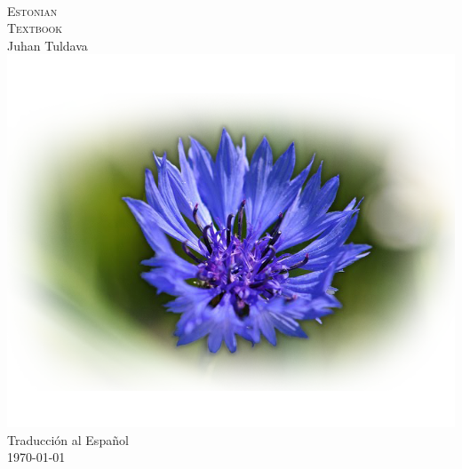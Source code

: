\begin{titlepage}
\begin{center}

	\textsc{ \fontsize{7cm}{1em}\selectfont \\[1.7cm] Estonian\\[0.3cm] 
	\Huge{Textbook}}\\[0.5cm]
	
	Juhan Tuldava \textdagger\\
	\includegraphics[scale=0.69]{images/Estonian_Flower.png}
	\vfill 
	Traducción al Español\\
	\today

\end{center}
\end{titlepage}
\thispagestyle{empty}
